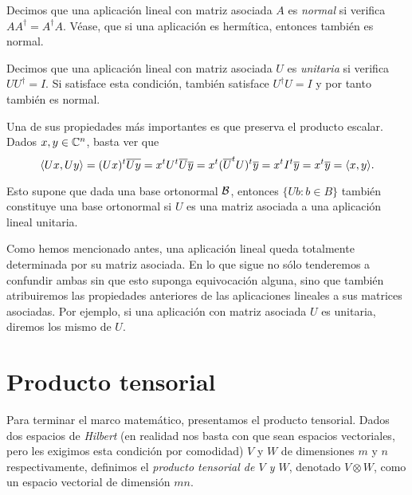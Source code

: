 \begin{definition} Decimos que una aplicación lineal con matriz asociada $A$ es \textit{normal} si verifica $AA^\dag=A^\dag A$. Véase, que si una aplicación es hermítica, entonces también es normal.
\end{definition}

\begin{definition} Decimos que una aplicación lineal con matriz asociada $U$ es \textit{unitaria} si verifica $UU^\dag=I$. Si satisface esta condición, también satisface $U^\dag U=I$ y por tanto también es normal.

Una de sus propiedades más importantes es que preserva el producto escalar. Dados $x,y\in\mathbb{C}^n$, basta ver que
\begin{equation}
\langle Ux,Uy\rangle=(Ux)^t\overline{Uy}=x^t U^t\overline{U}\overline{y}=x^t (\overline{U}^t U)^t\overline{y}=x^t I^t\overline{y}=x^t\overline{y}=\langle x,y\rangle.
\end{equation}

Esto supone que dada una base ortonormal $\mathcal{B}$, entonces $\{Ub: b\in B\}$ también constituye una base ortonormal si $U$ es una matriz asociada a una aplicación lineal unitaria.
\end{definition}

Como hemos mencionado antes, una aplicación lineal queda totalmente determinada por su matriz asociada. En lo que sigue no sólo tenderemos a confundir ambas sin que esto suponga equivocación alguna, sino que también atribuiremos las propiedades anteriores de las aplicaciones lineales a sus matrices asociadas. Por ejemplo, si una aplicación con matriz asociada $U$ es unitaria, diremos los mismo de $U$.

\section{Producto tensorial}
\label{sec:sec33}

Para terminar el marco matemático, presentamos el producto tensorial. Dados dos espacios de \textit{Hilbert} (en realidad nos basta con que sean espacios vectoriales, pero les exigimos esta condición por comodidad) $V$ y $W$ de dimensiones $m$ y $n$ respectivamente, definimos  el \textit{producto tensorial de $V$ y $W$}, denotado $V\otimes W$, como un espacio vectorial de dimensión $mn$.

